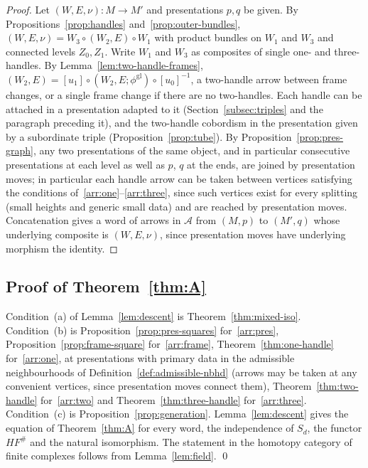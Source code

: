\documentclass[11pt]{amsart}
\theoremstyle{definition}
\theoremstyle{remark}
\theoremstyle{plain}
\numberwithin{equation}{section}
\newcommand{\HF}{\mathit{HF}}
\begin{document}
\begin{proof}
Let $(W,E,\nu)\colon M\to M'$ and presentations $p,q$ be given. By
Propositions~\ref{prop:handles} and~\ref{prop:outer-bundles},
$(W,E,\nu)=W_3\circ(W_2,E)\circ W_1$ with product bundles on $W_1$ and
$W_3$ and connected levels $Z_0,Z_1$. Write $W_1$ and $W_3$ as composites
of single one- and three-handles. By Lemma~\ref{lem:two-handle-frames},
$(W_2,E)=[u_1]\circ(W_2,E;\phi^{\mathrm{gl}})\circ[u_0]^{-1}$, a two-handle
arrow between frame changes, or a single frame change if there are no
two-handles. Each handle can be
attached in a presentation adapted to it
(Section~\ref{subsec:triples} and the paragraph preceding it), and the
two-handle cobordism in the presentation given by a subordinate triple
(Proposition~\ref{prop:tube}). By Proposition~\ref{prop:pres-graph},
any two presentations of the same object, and in particular consecutive
presentations at each level as well as $p$, $q$ at the ends, are joined
by presentation moves; in particular each handle arrow can be taken between
vertices satisfying the conditions of~\ref{arr:one}--\ref{arr:three}, since
such vertices exist for every splitting (small heights and generic small data) and are reached by presentation moves. Concatenation gives a word of arrows in
$\mathcal A$ from $(M,p)$ to $(M',q)$ whose underlying composite is
$(W,E,\nu)$, since presentation moves have underlying morphism the
identity.
\end{proof}

\subsection{Proof of Theorem~\ref{thm:A}}

Condition~(a) of Lemma~\ref{lem:descent} is
Theorem~\ref{thm:mixed-iso}. Condition~(b) is
Proposition~\ref{prop:pres-squares} for~\ref{arr:pres},
Proposition~\ref{prop:frame-square} for~\ref{arr:frame},
Theorem~\ref{thm:one-handle} for~\ref{arr:one}, at presentations with primary data in the
admissible neighbourhoods of Definition~\ref{def:admissible-nbhd} (arrows may be taken at any
convenient vertices, since presentation moves connect them),
Theorem~\ref{thm:two-handle} for~\ref{arr:two} and
Theorem~\ref{thm:three-handle} for~\ref{arr:three}. Condition~(c) is
Proposition~\ref{prop:generation}. Lemma~\ref{lem:descent} gives the
equation of Theorem~\ref{thm:A} for every word, the independence of
$S_d$, the functor $\HF^\#$ and the natural isomorphism. The statement
in the homotopy category of finite complexes follows from
Lemma~\ref{lem:field}. \qed
\end{document}
